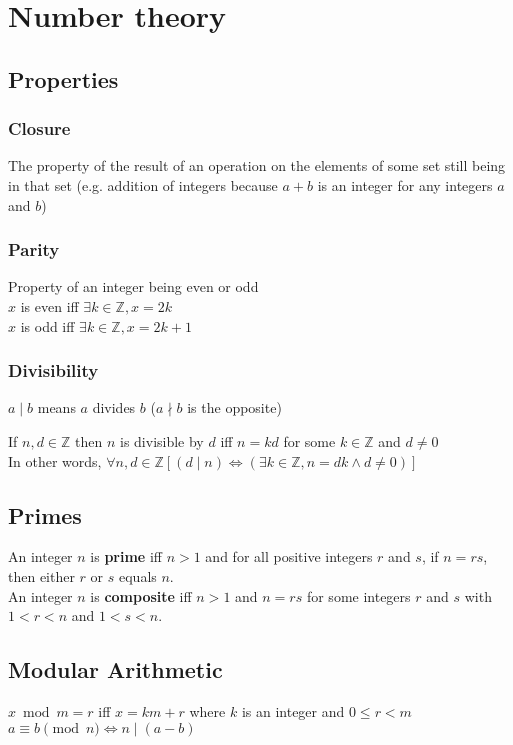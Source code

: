 \documentclass[12pt]{article}
\begin{document}
\section*{Number theory}

\subsection*{Properties}

\subsubsection*{Closure}

The property of the result of an operation on the elements of some set still being in that set (e.g. addition of integers because $a + b$ is an integer for any integers $a$ and $b$)

\subsubsection*{Parity}
Property of an integer being even or odd\\
$x$ is even iff $\exists k \in \mathbb Z, x = 2k$\\
$x$ is odd iff $\exists k \in \mathbb Z, x = 2k + 1$

\subsubsection*{Divisibility}
$a \mid b$ means $a$ divides $b$ ($a \nmid b$ is the opposite)

If $n,d \in \mathbb Z$ then $n$ is divisible by $d$ iff $n = kd$ for some $k \in \mathbb Z$ and $d \neq 0$\\
In other words, $\forall n, d \in \mathbb Z [(d \mid n) \Leftrightarrow (\exists k \in \mathbb Z, n = dk \land d \neq 0)]$

\subsection*{Primes}
An integer $n$ is \textbf{prime} iff $n>1$ and for all positive integers $r$ and $s$, if $n = rs$, then either $r$ or $s$ equals $n$.\\
An integer $n$ is \textbf{composite} iff $n>1$ and $n = rs$ for some integers $r$ and $s$ with $1<r<n$ and $1<s<n$.

\subsection*{Modular Arithmetic}
$x \bmod m = r$ iff $x = km + r$ where $k$ is an integer and  $0 \leq r < m$\\
$a \equiv b \pmod{n} \Leftrightarrow n \mid (a - b)$
\end{document}
